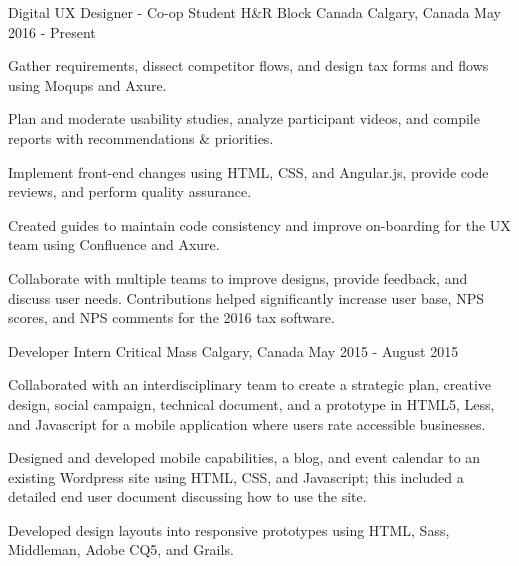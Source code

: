 
\begin{cventries}

  \cventry
    {Digital UX Designer - Co-op Student}
    {H\&R Block Canada}
    {Calgary, Canada}
    {May 2016 - Present}
    {
      \begin{cvitems}
        \item {Gather requirements, dissect competitor flows, and design tax forms and flows using Moqups and Axure.}
        \item {Plan and moderate usability studies, analyze participant videos, and compile reports with recommendations \& priorities.}
        \item {Implement front-end changes using HTML, CSS, and Angular.js, provide code reviews, and perform quality assurance.}
        \item {Created guides to maintain code consistency and improve on-boarding for the UX team using Confluence and Axure.}
        \item {Collaborate with multiple teams to improve designs, provide feedback, and discuss user needs. Contributions helped significantly increase user base, NPS scores, and NPS comments for the 2016 tax software.}
      \end{cvitems}
    }

  \cventry
    {Developer Intern}
    {Critical Mass}
    {Calgary, Canada}
    {May 2015 - August 2015}
    {
      \begin{cvitems}
        \item {Collaborated with an interdisciplinary team to create a strategic plan, creative design, social campaign, technical document, and a prototype in HTML5, Less, and Javascript for a mobile application where users rate accessible businesses.}
        \item {Designed and developed mobile capabilities, a blog, and event calendar to an existing Wordpress site using HTML, CSS, and Javascript; this included a detailed end user document discussing how to use the site.}
        \item {Developed design layouts into responsive prototypes using HTML, Sass, Middleman, Adobe CQ5, and Grails.}
      \end{cvitems}
    }


\end{cventries}
